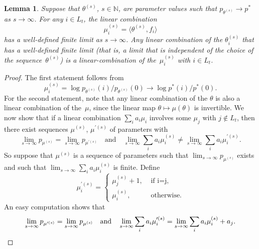 \documentclass[aos,noinfoline]{imsart}
\def\N{{\mathbb N}}
\def\<{\langle}
\def\>{\rangle}
\newtheorem{lemma}[theorem]{Lemma}
\theoremstyle{remark}
\theoremstyle{definition}
\begin{document}
\begin{lemma}
  \label{lem:mu-properties}
  Suppose that $\theta^{(s)}$, $s\in\N$, are parameter values such that $p_{\theta^{(s)}}\to p^{*}$ as $s\to\infty$.
  For any $i\in L_{t}$, the linear combination
  \begin{equation*}
    \mu_{i}^{(s)} = \<\theta^{(s)},f_{i}\> %
  \end{equation*}
  has a well-defined finite limit as $s\to\infty$.  Any linear combination of the $\theta_{i}^{(s)}$ that has a
  well-defined finite limit (that is, a limit that is independent of the choice of the sequence~$\theta^{(s)}$) is
  a linear-combination of the~$\mu_{i}^{(s)}$ with $i\in L_{t}$.
\end{lemma}
\begin{proof}
  The first statement follows from
  \begin{equation*}
    \mu_{i}^{(s)}=\log p_{\theta^{(s)}}(i)/p_{\theta^{(s)}}(0)\to\log
    p^{*}(i)/p^{*}(0).
\end{equation*}
  For the second statement, note that any linear combination of the $\theta$ is also a linear
  combination of the~$\mu$, since the linear map $\theta\mapsto\mu(\theta)$ is invertible.  We now show that if a linear
  combination $\sum_{i}a_{i}\mu_{i}$ involves some $\mu_{j}$ with $j\notin L_{t}$, then there exist sequences
  $\mu^{(s)}$, $\mu^{\prime(s)}$ of parameters with
  \begin{equation*}
    \lim_{s\to\infty}p_{\mu^{(s)}}=\lim_{s\to\infty}p_{\mu^{\prime(s)}}
    \quad\text{and}\quad
    \lim_{s\to\infty}\sum_{i}a_{i}\mu_{i}^{(s)}\neq\lim_{s\to\infty}\sum_{i}a_{i}\mu_{i}^{\prime(s)}.
  \end{equation*}
  So suppose that $\mu^{(s)}$ is a sequence of parameters such that $\lim_{s\to\infty}p_{\mu^{(s)}}$ exists and such
  that $\lim_{s\to\infty}\sum_{i}a_{i}\mu_{i}^{(s)}$ is finite.  Define
  \begin{equation*}
    \mu_{i}^{\prime(s)} =
    \begin{cases}
      \mu_{j}^{(s)} + 1, & \text{ if i=j}, \\
      \mu_{i}^{(s)}, & \text{ otherwise.}
    \end{cases}
  \end{equation*}
  An easy computation shows that
  \begin{equation*}
    \lim_{s\to\infty}p_{\mu^{\prime(s)}}=\lim_{s\to\infty}p_{\mu^{(s)}}
    \quad\text{and}\quad
    \lim_{s\to\infty}\sum_{i}a_{i}\mu_{i}^{\prime(s)}=\lim_{s\to\infty}\sum_{i}a_{i}\mu_{i}^{(s)} + a_{j}.
    \qedhere
  \end{equation*}
\end{proof}
\end{document}
